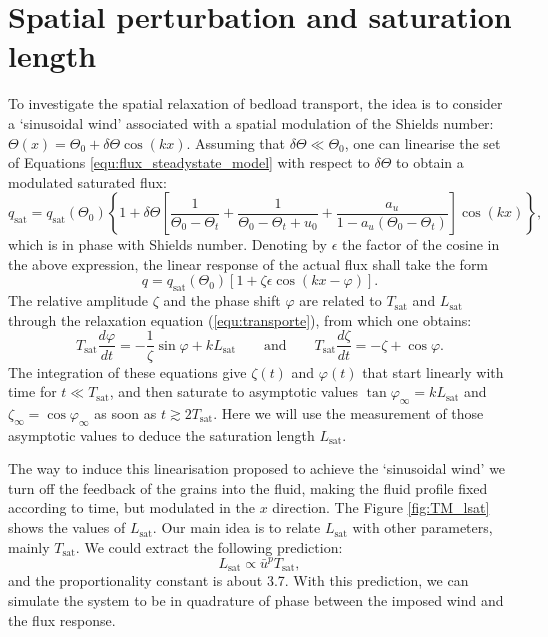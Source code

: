 \section{Spatial perturbation and saturation length}
\label{sec:Lsat}
    To investigate the spatial relaxation of bedload transport, the idea is to consider a `sinusoidal wind' associated with a spatial modulation of the Shields number: $\Theta(x) = \Theta_0 + \delta\Theta \cos (kx)$. Assuming that $\delta\Theta \ll \Theta_0$, one can linearise the set of Equations \ref{equ:flux_steadystate_model} with respect to $\delta\Theta$ to obtain a modulated saturated flux:
%
\begin{equation}
q_\textrm{sat} = q_\textrm{sat}(\Theta_0) \left\{ 1 + \delta\Theta \left[ \frac{1}{\Theta_0 - \Theta_t} + \frac{1}{\Theta_0 - \Theta_t + u_0} + \frac{a_u}{1 - a_u \left( \Theta_0 - \Theta_t \right)} \right] \cos \left( kx \right) \right\},
\label{eq:modulated_saturatedflux}
\end{equation}
%
which is in phase with Shields number. Denoting by $\epsilon$ the factor of the cosine in the above expression, the linear response of the actual flux shall take the form
%
\begin{equation}
q = q_\textrm{sat}(\Theta_0) \left[ 1 + \zeta \epsilon \cos \left( kx - \varphi \right) \right].
\label{eq:modulated_flux}
\end{equation}
%
The relative amplitude $\zeta$ and the phase shift $\varphi$ are related to $T_\textrm{sat}$ and $L_\textrm{sat}$ through the relaxation equation (\ref{equ:transporte}), from which one obtains:
%
\begin{equation}
T_\textrm{sat} \frac{d\varphi}{dt} = - \frac{1}{\zeta} \sin\varphi + kL_\textrm{sat}
\qquad \mbox{and} \qquad
T_\textrm{sat} \frac{d\zeta}{dt} = - \zeta + \cos\varphi.
\label{eq:phase_and_amplitude_evolution}
\end{equation}
%
The integration of these equations give $\zeta(t)$ and $\varphi(t)$ that start linearly with time for $t \ll T_\textrm{sat}$, and then saturate to asymptotic values $\tan\varphi_\infty = kL_\textrm{sat}$ and $\zeta_\infty = \cos\varphi_\infty$ as soon as $t \gtrsim 2 T_\textrm{sat}$. Here we will use the measurement of those asymptotic values to deduce the saturation length $L_\textrm{sat}$.

    The way to induce this linearisation proposed to achieve the `sinusoidal wind' we turn off the feedback of the grains into the fluid, making the fluid profile fixed according to time, but modulated in the $x$ direction. The Figure \ref{fig:TM_lsat} shows the values of $L_\textrm{sat}$. Our main idea is to relate $L_\textrm{sat}$ with other parameters, mainly $T_\textrm{sat}$. We could extract the following prediction:
\begin{equation}
    L_\textrm{sat} \propto \bar{u}^p T_\textrm{sat},
\end{equation}
and the proportionality constant is about 3.7. With this prediction, we can simulate the system to be in quadrature of phase between the imposed wind and the flux response.

